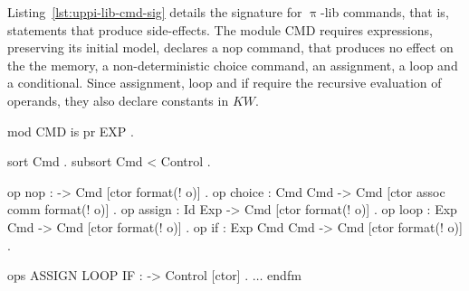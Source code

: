 \documentclass{llncs}%
\begin{document}
Listing~\ref{lst:uppi-lib-cmd-sig} details the signature for $\uppi$-lib commands, that is, statements that produce side-effects. The module CMD requires expressions, preserving its initial model, declares a nop command, that produces no effect on the the memory, a non-deterministic choice command, an assignment, a loop and a conditional. Since assignment, loop and if require the recursive evaluation of operands, they also declare constants in $\mathit{KW}$.  
\begin{maude}[caption=Signature for $\uppi$-lib commands in Maude,label=lst:uppi-lib-cmd-sig]
mod CMD is
    pr EXP .

    sort Cmd .
    subsort Cmd < Control .

    op nop : -> Cmd [ctor format(! o)] .
    op choice : Cmd Cmd -> Cmd [ctor assoc comm format(! o)] .
    op assign : Id Exp -> Cmd [ctor format(! o)] .
    op loop : Exp Cmd -> Cmd [ctor format(! o)] .
    op if : Exp Cmd Cmd -> Cmd [ctor format(! o)] .

    ops ASSIGN LOOP IF : -> Control [ctor] . 
    $\ldots$
endfm
\end{maude}
\end{document}
